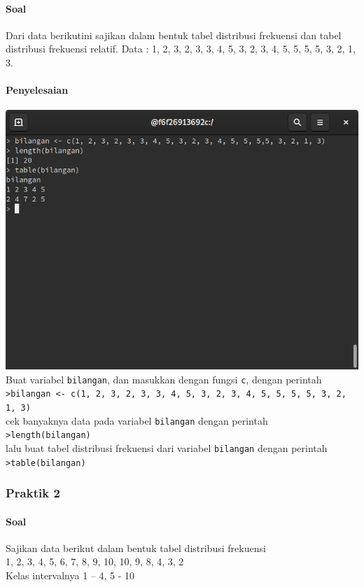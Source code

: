 \documentclass[a4paper,12pt]{article}
\begin{document}
\paragraph{Soal\\}
Dari data berikutini sajikan dalam bentuk tabel distribusi frekuensi dan tabel distribusi frekuensi relatif. Data : 1, 2, 3, 2, 3, 3, 4, 5, 3, 2, 3, 4, 5, 5, 5, 5, 3, 2, 1, 3.\\
\paragraph{Penyelesaian\\}
\includegraphics[width=\linewidth]{3}
Buat variabel \texttt{bilangan}, dan masukkan dengan fungsi \texttt{c}, dengan perintah\\
\texttt{>bilangan <- c(1, 2, 3, 2, 3, 3, 4, 5, 3, 2, 3, 4, 5, 5, 5, 5, 3, 2, 1, 3)\\}
cek banyaknya data pada variabel \texttt{bilangan} dengan perintah\\
\texttt{>length(bilangan)}\\
lalu buat tabel distribusi frekuensi dari variabel \texttt{bilangan} dengan perintah\\
\texttt{>table(bilangan)}
\subsubsection{Praktik 2}
\paragraph{Soal\\}
Sajikan data berikut dalam bentuk tabel distribusi frekuensi\\ 
1, 2, 3, 4, 5, 6, 7, 8, 9, 10, 10, 9, 8, 4, 3, 2\\ 
Kelas intervalnya 1 – 4, 5 - 10\\
\end{document}
